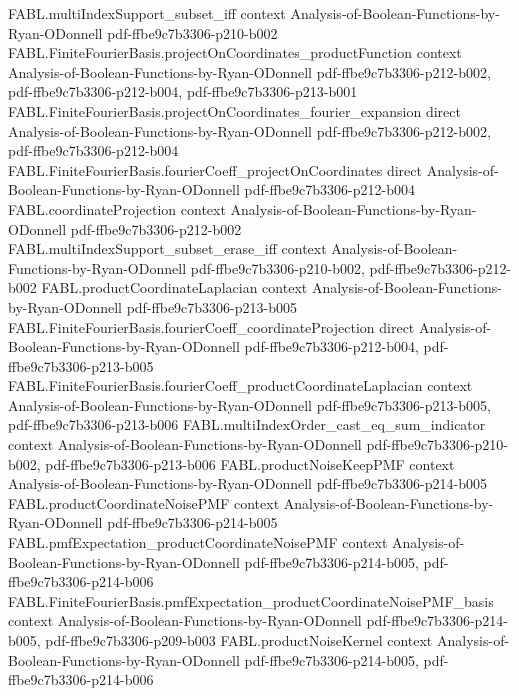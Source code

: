 \begin{theorem}
  {FABL.multiIndexSupport_subset_iff}
  {context}
  {Analysis-of-Boolean-Functions-by-Ryan-ODonnell}
  {pdf-ffbe9c7b3306-p210-b002}
\proofstep
  {FABL.FiniteFourierBasis.projectOnCoordinates_productFunction}
  {context}
  {Analysis-of-Boolean-Functions-by-Ryan-ODonnell}
  {pdf-ffbe9c7b3306-p212-b002,
    pdf-ffbe9c7b3306-p212-b004,
    pdf-ffbe9c7b3306-p213-b001}
\proofstep
  {FABL.FiniteFourierBasis.projectOnCoordinates_fourier_expansion}
  {direct}
  {Analysis-of-Boolean-Functions-by-Ryan-ODonnell}
  {pdf-ffbe9c7b3306-p212-b002,
    pdf-ffbe9c7b3306-p212-b004}
\proofstep
  {FABL.FiniteFourierBasis.fourierCoeff_projectOnCoordinates}
  {direct}
  {Analysis-of-Boolean-Functions-by-Ryan-ODonnell}
  {pdf-ffbe9c7b3306-p212-b004}
\proofstep
  {FABL.coordinateProjection}
  {context}
  {Analysis-of-Boolean-Functions-by-Ryan-ODonnell}
  {pdf-ffbe9c7b3306-p212-b002}
\proofstep
  {FABL.multiIndexSupport_subset_erase_iff}
  {context}
  {Analysis-of-Boolean-Functions-by-Ryan-ODonnell}
  {pdf-ffbe9c7b3306-p210-b002,
    pdf-ffbe9c7b3306-p212-b002}
\proofstep
  {FABL.productCoordinateLaplacian}
  {context}
  {Analysis-of-Boolean-Functions-by-Ryan-ODonnell}
  {pdf-ffbe9c7b3306-p213-b005}
\proofstep
  {FABL.FiniteFourierBasis.fourierCoeff_coordinateProjection}
  {direct}
  {Analysis-of-Boolean-Functions-by-Ryan-ODonnell}
  {pdf-ffbe9c7b3306-p212-b004,
    pdf-ffbe9c7b3306-p213-b005}
\proofstep
  {FABL.FiniteFourierBasis.fourierCoeff_productCoordinateLaplacian}
  {context}
  {Analysis-of-Boolean-Functions-by-Ryan-ODonnell}
  {pdf-ffbe9c7b3306-p213-b005,
    pdf-ffbe9c7b3306-p213-b006}
\proofstep
  {FABL.multiIndexOrder_cast_eq_sum_indicator}
  {context}
  {Analysis-of-Boolean-Functions-by-Ryan-ODonnell}
  {pdf-ffbe9c7b3306-p210-b002,
    pdf-ffbe9c7b3306-p213-b006}
\proofstep
  {FABL.productNoiseKeepPMF}
  {context}
  {Analysis-of-Boolean-Functions-by-Ryan-ODonnell}
  {pdf-ffbe9c7b3306-p214-b005}
\proofstep
  {FABL.productCoordinateNoisePMF}
  {context}
  {Analysis-of-Boolean-Functions-by-Ryan-ODonnell}
  {pdf-ffbe9c7b3306-p214-b005}
\proofstep
  {FABL.pmfExpectation_productCoordinateNoisePMF}
  {context}
  {Analysis-of-Boolean-Functions-by-Ryan-ODonnell}
  {pdf-ffbe9c7b3306-p214-b005,
    pdf-ffbe9c7b3306-p214-b006}
\proofstep
  {FABL.FiniteFourierBasis.pmfExpectation_productCoordinateNoisePMF_basis}
  {context}
  {Analysis-of-Boolean-Functions-by-Ryan-ODonnell}
  {pdf-ffbe9c7b3306-p214-b005,
    pdf-ffbe9c7b3306-p209-b003}
\proofstep
  {FABL.productNoiseKernel}
  {context}
  {Analysis-of-Boolean-Functions-by-Ryan-ODonnell}
  {pdf-ffbe9c7b3306-p214-b005,
    pdf-ffbe9c7b3306-p214-b006}

\end{theorem}
